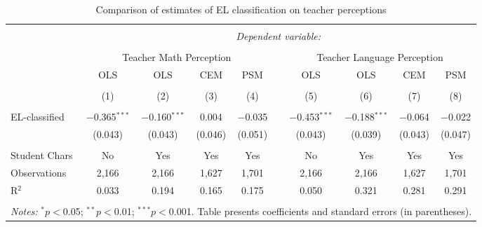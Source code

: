 
\begin{table}[!htbp] \centering 
  \caption{Comparison of estimates of EL classification on teacher perceptions} 
  \label{tab:match} 
\begin{tabular}{@{\extracolsep{5pt}}lccccccccc} 
\\[-1.8ex]\hline 
\hline \\[-1.8ex] 
 & \multicolumn{9}{c}{\textit{Dependent variable:}} \\ 
\cline{2-9} 
\\[-1.8ex] & \multicolumn{4}{c}{Teacher Math Perception} && \multicolumn{4}{c}{Teacher Language Perception} \\ 
 & OLS & OLS & CEM & PSM && OLS & OLS & CEM & PSM \\
 \cline{2-5} \cline{7-10} 
\\[-1.8ex] & (1) & (2) & (3) & (4) && (5) & (6) & (7) & (8)\\ 
\hline \\[-1.8ex] 
 EL-classified & $-$0.365$^{***}$ & $-$0.160$^{***}$ & 0.004 & $-$0.035 && $-$0.453$^{***}$ & $-$0.188$^{***}$ & $-$0.064 & $-$0.022 \\ 
  & (0.043) & (0.043) & (0.046) & (0.051) && (0.043) & (0.039) & (0.043) & (0.047) \\ 
\hline \\[-1.8ex] 
Student Chars & No & Yes & Yes & Yes && No & Yes & Yes & Yes \\ 
Observations & 2,166 & 2,166 & 1,627 & 1,701 && 2,166 & 2,166 & 1,627 & 1,701 \\ 
R$^{2}$ & 0.033 & 0.194 & 0.165 & 0.175 && 0.050 & 0.321 & 0.281 & 0.291 \\ 
\hline 
\hline \\[-1.8ex] 
 \multicolumn{10}{l}{\textit{Notes:}  $^{*}p<$0.05; $^{**}p<$0.01; $^{***}p<$0.001. Table presents coefficients and standard errors (in parentheses).} \\ 
\end{tabular} 
\end{table} 
